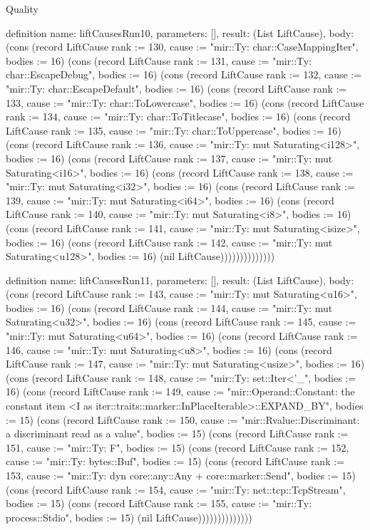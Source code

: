 \begin{lexlean}{Quality}
\begin{semanticmodule}
definition{
  name: liftCausesRun10,
  parameters: [],
  result: (List LiftCause),
  body: (cons (record LiftCause {rank := 130, cause := "mir::Ty: char::CaseMappingIter", bodies := 16}) (cons (record LiftCause {rank := 131, cause := "mir::Ty: char::EscapeDebug", bodies := 16}) (cons (record LiftCause {rank := 132, cause := "mir::Ty: char::EscapeDefault", bodies := 16}) (cons (record LiftCause {rank := 133, cause := "mir::Ty: char::ToLowercase", bodies := 16}) (cons (record LiftCause {rank := 134, cause := "mir::Ty: char::ToTitlecase", bodies := 16}) (cons (record LiftCause {rank := 135, cause := "mir::Ty: char::ToUppercase", bodies := 16}) (cons (record LiftCause {rank := 136, cause := "mir::Ty: mut Saturating<i128>", bodies := 16}) (cons (record LiftCause {rank := 137, cause := "mir::Ty: mut Saturating<i16>", bodies := 16}) (cons (record LiftCause {rank := 138, cause := "mir::Ty: mut Saturating<i32>", bodies := 16}) (cons (record LiftCause {rank := 139, cause := "mir::Ty: mut Saturating<i64>", bodies := 16}) (cons (record LiftCause {rank := 140, cause := "mir::Ty: mut Saturating<i8>", bodies := 16}) (cons (record LiftCause {rank := 141, cause := "mir::Ty: mut Saturating<isize>", bodies := 16}) (cons (record LiftCause {rank := 142, cause := "mir::Ty: mut Saturating<u128>", bodies := 16}) (nil LiftCause))))))))))))))
}

definition{
  name: liftCausesRun11,
  parameters: [],
  result: (List LiftCause),
  body: (cons (record LiftCause {rank := 143, cause := "mir::Ty: mut Saturating<u16>", bodies := 16}) (cons (record LiftCause {rank := 144, cause := "mir::Ty: mut Saturating<u32>", bodies := 16}) (cons (record LiftCause {rank := 145, cause := "mir::Ty: mut Saturating<u64>", bodies := 16}) (cons (record LiftCause {rank := 146, cause := "mir::Ty: mut Saturating<u8>", bodies := 16}) (cons (record LiftCause {rank := 147, cause := "mir::Ty: mut Saturating<usize>", bodies := 16}) (cons (record LiftCause {rank := 148, cause := "mir::Ty: set::Iter<'_", bodies := 16}) (cons (record LiftCause {rank := 149, cause := "mir::Operand::Constant: the constant item <I as iter::traits::marker::InPlaceIterable>::EXPAND_BY", bodies := 15}) (cons (record LiftCause {rank := 150, cause := "mir::Rvalue::Discriminant: a discriminant read as a value", bodies := 15}) (cons (record LiftCause {rank := 151, cause := "mir::Ty: F", bodies := 15}) (cons (record LiftCause {rank := 152, cause := "mir::Ty: bytes::Buf", bodies := 15}) (cons (record LiftCause {rank := 153, cause := "mir::Ty: dyn core::any::Any + core::marker::Send", bodies := 15}) (cons (record LiftCause {rank := 154, cause := "mir::Ty: net::tcp::TcpStream", bodies := 15}) (cons (record LiftCause {rank := 155, cause := "mir::Ty: process::Stdio", bodies := 15}) (nil LiftCause))))))))))))))
}


\end{semanticmodule}
\end{lexlean}
